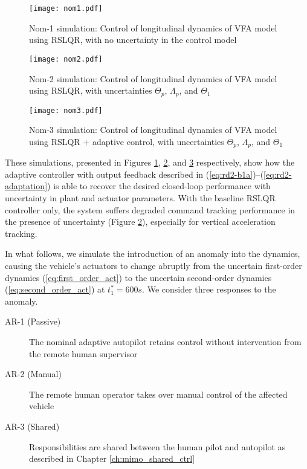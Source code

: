 \begin{figure}[htbp]
	\centering
	\texttt{[image: nom1.pdf]}
	\caption{Nom-1 simulation: Control of longitudinal dynamics of VFA model using RSLQR, with no uncertainty in the control model}
	\label{fig:nom1}
\end{figure}

\begin{figure}[htbp]
	\centering
	\texttt{[image: nom2.pdf]}
	\caption{Nom-2 simulation: Control of longitudinal dynamics of VFA model using RSLQR, with uncertainties $\Theta_p$, $\Lambda_p$, and $\Theta_1$}
	\label{fig:nom2}
\end{figure}

\begin{figure}[htbp]
	\centering
	\texttt{[image: nom3.pdf]}
	\caption{Nom-3 simulation: Control of longitudinal dynamics of VFA model using RSLQR + adaptive control, with uncertainties $\Theta_p$, $\Lambda_p$, and $\Theta_1$}
	\label{fig:nom3}
\end{figure}

These simulations, presented in Figures \ref{fig:nom1}, \ref{fig:nom2}, and \ref{fig:nom3} respectively, show how the adaptive controller with output feedback described in (\ref{eq:rd2-b1a})--(\ref{eq:rd2-adaptation}) is able to recover the desired closed-loop performance with uncertainty in plant and actuator parameters. With the baseline RSLQR controller only, the system suffers degraded command tracking performance in the presence of uncertainty (Figure \ref{fig:nom2}), especially for vertical acceleration tracking.

In what follows, we simulate the introduction of an anomaly into the dynamics, causing the vehicle's actuators to change abruptly from the uncertain first-order dynamics (\ref{eq:first_order_act}) to the uncertain second-order dynamics (\ref{eq:second_order_act}) at $t_1^* = 600s$. We consider three responses to the anomaly.
\begin{description}
	\item[AR-1 (Passive)] The nominal adaptive autopilot retains control without intervention from the remote human supervisor
	\item[AR-2 (Manual)] The remote human operator takes over manual control of the affected vehicle
	\item[AR-3 (Shared)] Responsibilities are shared between the human pilot and autopilot as described in Chapter \ref{ch:mimo_shared_ctrl}
\end{description}


